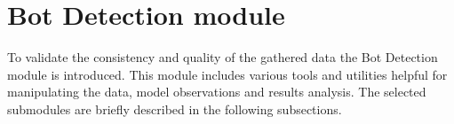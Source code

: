 \section{Bot Detection module}\label{sec:bot-detection-module}
To validate the consistency and quality of the gathered data the Bot Detection module is introduced.
This module includes various tools and utilities helpful for manipulating the data, model observations and results analysis.
The selected submodules are briefly described in the following subsections.